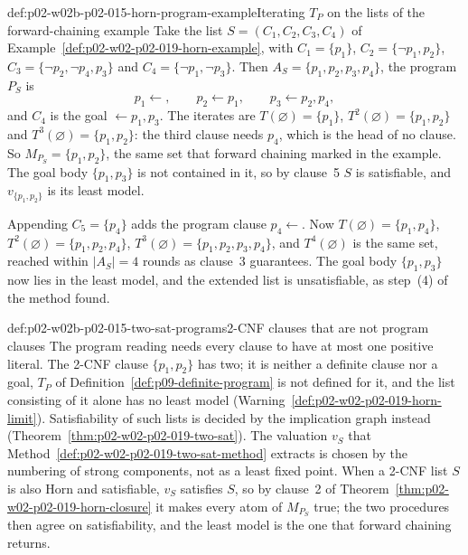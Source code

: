 \begin{hbexample}{def:p02-w02b-p02-015-horn-program-example}{Iterating \(T_P\) on the lists of the forward-chaining example}
Take the list \(S=(C_1,C_2,C_3,C_4)\) of
Example~\ref{def:p02-w02-p02-019-horn-example}, with
\(C_1=\{p_1\}\), \(C_2=\{\neg p_1,p_2\}\),
\(C_3=\{\neg p_2,\neg p_4,p_3\}\) and \(C_4=\{\neg p_1,\neg p_3\}\).  Then
\(A_S=\{p_1,p_2,p_3,p_4\}\), the program \(P_S\) is
\[
 p_1\leftarrow{},\qquad p_2\leftarrow p_1,\qquad p_3\leftarrow p_2,p_4,
\]
and \(C_4\) is the goal \(\leftarrow p_1,p_3\).  The iterates are
\(T(\varnothing)=\{p_1\}\), \(T^2(\varnothing)=\{p_1,p_2\}\) and
\(T^3(\varnothing)=\{p_1,p_2\}\): the third clause needs \(p_4\), which is the
head of no clause.  So \(M_{P_S}=\{p_1,p_2\}\), the same set that forward
chaining marked in the example.  The goal body \(\{p_1,p_3\}\) is not
contained in it, so by clause~5 \(S\) is satisfiable, and
\(v_{\{p_1,p_2\}}\) is its least model.

Appending \(C_5=\{p_4\}\) adds the program clause \(p_4\leftarrow{}\).  Now
\(T(\varnothing)=\{p_1,p_4\}\), \(T^2(\varnothing)=\{p_1,p_2,p_4\}\),
\(T^3(\varnothing)=\{p_1,p_2,p_3,p_4\}\), and \(T^4(\varnothing)\) is the same
set, reached within \(|A_S|=4\) rounds as clause~3 guarantees.  The goal body
\(\{p_1,p_3\}\) now lies in the least model, and the extended list is
unsatisfiable, as step~(4) of the method found.
\end{hbexample}

\begin{hbwarning}{def:p02-w02b-p02-015-two-sat-programs}{2-CNF clauses that are not program clauses}
The program reading needs every clause to have at most one positive literal.
The 2-CNF clause \(\{p_1,p_2\}\) has two; it is neither a definite clause nor
a goal, \(T_P\) of Definition~\ref{def:p09-definite-program} is not defined
for it, and the list consisting of it alone has no least model
(Warning~\ref{def:p02-w02-p02-019-horn-limit}).  Satisfiability of such lists
is decided by the implication graph instead
(Theorem~\ref{thm:p02-w02-p02-019-two-sat}).  The valuation \(v_S\) that
Method~\ref{def:p02-w02-p02-019-two-sat-method} extracts is chosen by the
numbering of strong components, not as a least fixed point.  When a 2-CNF list
\(S\) is also Horn and satisfiable, \(v_S\) satisfies \(S\), so by clause~2 of
Theorem~\ref{thm:p02-w02-p02-019-horn-closure} it makes every atom of
\(M_{P_S}\) true; the two procedures then agree on satisfiability, and the
least model is the one that forward chaining returns.
\end{hbwarning}

